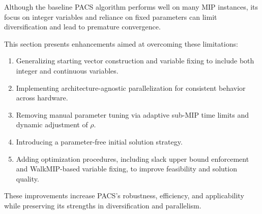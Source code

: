 Although the baseline PACS algorithm performs well on many MIP instances, its focus on integer variables and reliance on fixed parameters can limit diversification and lead to premature convergence.

This section presents enhancements aimed at overcoming these limitations:
\begin{enumerate}
\item Generalizing starting vector construction and variable fixing to include both integer and continuous variables.
\item Implementing architecture-agnostic parallelization for consistent behavior across hardware.
\item Removing manual parameter tuning via adaptive sub-MIP time limits and dynamic adjustment of $\rho$.
\item Introducing a parameter-free initial solution strategy.
\item Adding optimization procedures, including slack upper bound enforcement and WalkMIP-based variable fixing, to improve feasibility and solution quality.
\end{enumerate}

These improvements increase PACS’s robustness, efficiency, and applicability while preserving its strengths in diversification and parallelism.

